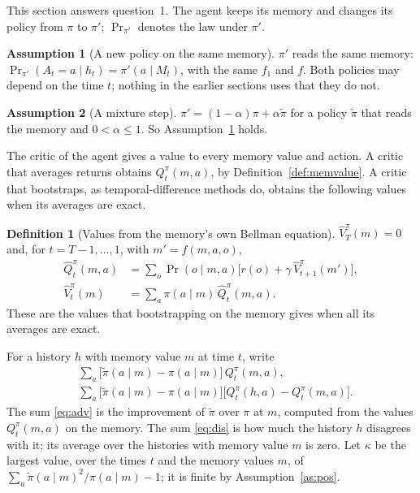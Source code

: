\documentclass{article}
\theoremstyle{definition}
\newtheorem{definition}[proposition]{Definition}
\newtheorem{assumption}{Assumption}
\newcommand{\Prn}{\Pr\nolimits_{\pi'}}
\begin{document}
This section answers question~1. The agent keeps its memory and changes its policy from $\pi$ to $\pi'$; $\Prn$ denotes the law under $\pi'$.
\begin{assumption}[A new policy on the same memory]\label{as:new}
$\pi'$ reads the same memory: $\Prn(A_t=a\mid h_t)=\pi'(a\mid M_t)$, with the same $f_1$ and $f$. Both policies may depend on the time $t$; nothing in the earlier sections uses that they do not.
\end{assumption}
\begin{assumption}[A mixture step]\label{as:mix}
$\pi'=(1-\alpha)\pi+\alpha\tilde\pi$ for a policy $\tilde\pi$ that reads the memory and $0<\alpha\le1$. So Assumption~\ref{as:new} holds.
\end{assumption}
The critic of the agent gives a value to every memory value and action. A critic that averages returns obtains $Q^\pi_t(m,a)$, by Definition~\ref{def:memvalue}. A critic that bootstraps, as temporal-difference methods do, obtains the following values when its averages are exact.
\begin{definition}[Values from the memory's own Bellman equation]\label{def:hat}
$\hat V^\pi_T(m)=0$ and, for $t=T-1,\dots,1$, with $m'=f(m,a,o)$,
\begin{align*}
\hat Q^\pi_t(m,a)&=\sum_o\Pr(o\mid m,a)\big[r(o)+\gamma\,\hat V^\pi_{t+1}(m')\big],\\
\hat V^\pi_t(m)&=\sum_a\pi(a\mid m)\,\hat Q^\pi_t(m,a).
\end{align*}
These are the values that bootstrapping on the memory gives when all its averages are exact.
\end{definition}
For a history $h$ with memory value $m$ at time $t$, write
\begin{align}
&\sum_a\big[\tilde\pi(a\mid m)-\pi(a\mid m)\big]\,Q^\pi_t(m,a), \label{eq:adv}\\
&\sum_a\big[\tilde\pi(a\mid m)-\pi(a\mid m)\big]\big[Q^\pi_t(h,a)-Q^\pi_t(m,a)\big]. \label{eq:dis}
\end{align}
The sum \eqref{eq:adv} is the improvement of $\tilde\pi$ over $\pi$ at $m$, computed from the values $Q^\pi_t(m,a)$ on the memory. The sum \eqref{eq:dis} is how much the history $h$ disagrees with it; its average over the histories with memory value $m$ is zero. Let $\kappa$ be the largest value, over the times $t$ and the memory values $m$, of $\sum_a\tilde\pi(a\mid m)^2/\pi(a\mid m)-1$; it is finite by Assumption~\ref{as:pos}.
\end{document}
